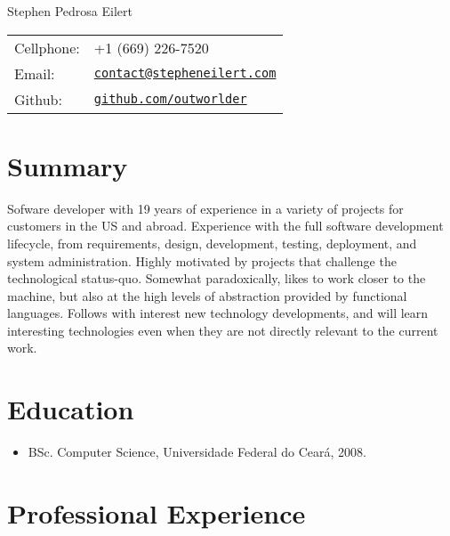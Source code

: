 \documentclass[letterpaper]{article}
\def\name{Stephen Pedrosa Eilert}
\begin{document}
\begin{flushright}

{\huge \name}


\vspace{0.20in}
\begin{minipage}{0.45\linewidth}
  \begin{tabular}{ll}
    Cellphone: & +1 (669) 226-7520 \\
    Email: & \href{mailto:contact@stepheneilert.com}{\tt contact@stepheneilert.com} \\
    Github: & \href{https://github.com/outworlder}{\tt github.com/outworlder}
  \end{tabular}
\end{minipage}
\end{flushright}

\section*{Summary}
  Sofware developer with 19 years of experience in a variety of projects for customers in the US and abroad. Experience with the full software development lifecycle, from requirements, design, development, testing, deployment, and system administration. Highly motivated by projects that challenge the technological status-quo. Somewhat paradoxically, likes to work closer to the machine, but also at the high levels of abstraction provided by functional languages. Follows with interest new technology developments, and will learn interesting technologies even when they are not directly relevant to the current work.

\section*{Education}

\begin{itemize}
  \item BSc. Computer Science, Universidade Federal do Ceará, 2008.
\end{itemize}

\section*{Professional Experience}
\end{document}
